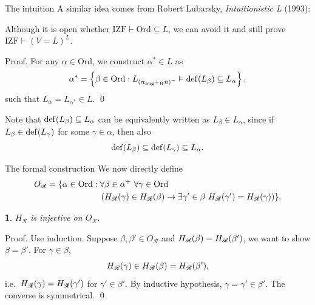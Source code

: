 \documentclass{beamer}
\makeatletter
\newtheorem{named@thm}{\curr@thmname}
\newenvironment{namedthm}[1]
  {\def\curr@thmname{#1}\begin{named@thm}}
  {\end{named@thm}}
\newcommand{\IZF}{\mathrm{IZF}}
\newcommand{\Ord}{\mathrm{Ord}}
\newcommand{\exampletext}[1]{\textcolor{green!50!black}{#1}}
\makeatother
\begin{document}
\begin{frame}{The intuition}
  A similar idea comes from Robert Lubarsky, \emph{Intuitionistic L} (1993)\nocite{lubarsky93-intuitionistic-l}:
  \begin{theorem}
    Although it is open whether $\IZF \vdash \Ord \subseteq L$, we can avoid it and still prove $\IZF \vdash \left(V = L\right)^L$.
  \end{theorem}

  \vspace{0.4em}

  \exampletext{Proof.} For any $\alpha \in \Ord$, we construct $\alpha^* \in L$ as
  \[\alpha^* = \left\{\beta \in \Ord : L_{\left(\alpha_\text{aug} +_\mathrm{H} n\right)^-} \vDash \mathrm{def}\mleft(L_\beta\mright) \subseteq L_\alpha\right\},\]
  such that $L_\alpha = L_{\alpha^*} \in L$. \qed

  \vspace{1em}

  Note that $\mathrm{def}\mleft(L_\beta\mright) \subseteq L_\alpha$ can be equivalently written as $L_\beta \in L_\alpha$, since if $L_\beta \in \mathrm{def}\mleft(L_\gamma\mright)$ for some $\gamma \in \alpha$, then also
  \[\mathrm{def}\mleft(L_\beta\mright) \subseteq \mathrm{def}\mleft(L_\gamma\mright) \subseteq L_\alpha.\]
\end{frame}

\begin{frame}{The formal construction}
  We now directly define
  \begin{align*}
    O_\mathscr{R} = \{\alpha \in \Ord : {} & \forall \beta \in \alpha^+ \ \forall \gamma \in \Ord                                                                                                                                                      \\
                                           & \left(H_\mathscr{R}\mleft(\gamma\mright) \in H_\mathscr{R}\mleft(\beta\mright) \rightarrow \exists \gamma' \in \beta \ H_\mathscr{R}\mleft(\gamma'\mright) = H_\mathscr{R}\mleft(\gamma\mright)\right)\}.
  \end{align*}

  \pause

  \begin{namedthm}{Proposition}
    $H_\mathscr{R}$ is injective on $O_\mathscr{R}$.
  \end{namedthm}

  \vspace{0.4em}

  \exampletext{Proof.} Use induction. Suppose $\beta, \beta' \in O_\mathscr{R}$ and $H_\mathscr{R}\mleft(\beta\mright) = H_\mathscr{R}\mleft(\beta'\mright)$, we want to show $\beta = \beta'$. For $\gamma \in \beta$,
  \[H_\mathscr{R}\mleft(\gamma\mright) \in H_\mathscr{R}\mleft(\beta\mright) = H_\mathscr{R}\mleft(\beta'\mright),\]
  i.e.\ $H_\mathscr{R}\mleft(\gamma\mright) = H_\mathscr{R}\mleft(\gamma'\mright)$ for $\gamma' \in \beta'$. By inductive hypothesis, $\gamma = \gamma' \in \beta'$. The converse is symmetrical. \qed
\end{frame}
\end{document}
